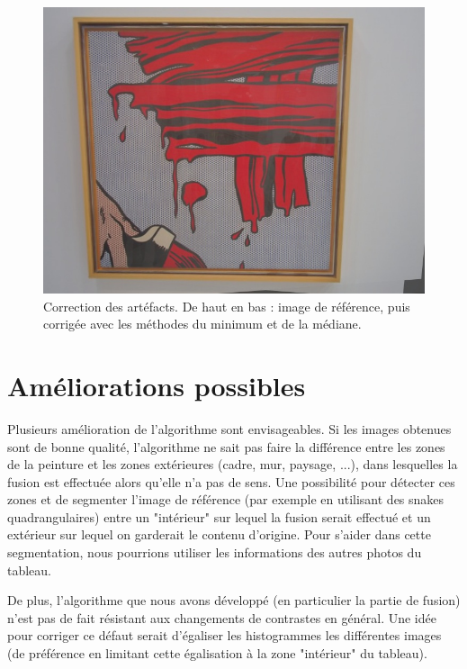 \documentclass[12pt,a4paper]{article}
\begin{document}
\begin{figure}
\begin{minipage}{0.6\linewidth}
\end{minipage}
\begin{minipage}{0.6\linewidth}
\includegraphics[width=\textwidth]{Fig/merge_median.jpg}
\end{minipage}
\caption{Correction des artéfacts. De haut en bas : image de référence, puis corrigée avec les méthodes du minimum et de la médiane.}
\label{mediane}
\end{figure} 
\section{Améliorations possibles}

Plusieurs amélioration de l'algorithme sont envisageables. Si les images obtenues sont de bonne qualité, l'algorithme ne sait pas faire la différence entre les zones de la peinture et les zones extérieures (cadre, mur, paysage, ...), dans lesquelles la fusion est effectuée alors qu'elle n'a pas de sens. Une possibilité pour détecter ces zones et de segmenter l'image de référence (par exemple en utilisant des snakes quadrangulaires) entre un "intérieur" sur lequel la fusion serait effectué et un extérieur sur lequel on garderait le contenu d'origine. Pour s'aider dans cette segmentation, nous pourrions utiliser les informations des autres photos du tableau.

De plus, l'algorithme que nous avons développé (en particulier la partie de fusion) n'est pas de fait résistant aux changements de contrastes en général. Une idée pour corriger ce défaut serait d'égaliser les histogrammes les différentes images (de préférence en limitant cette égalisation à la zone "intérieur" du tableau).


\end{document}
